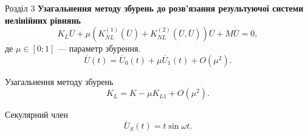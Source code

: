 \documentclass[handout, 8pt]{beamer}
\numberwithin{figure}{section}
\numberwithin{equation}{section}
\numberwithin{table}{section}
\begin{document}
\begin{frame}{Розділ 3}
\textbf{Узагальнення методу збурень до розв’язання результуючої системи нелінійних рівнянь}
\begin{equation}\label{eq:nonlineq}
K_L\overline{U}+\mu \left( K_{NL}^{(1)}\left( \overline{U}\right)+K_{NL}^{(2)}\left( \overline{U},\overline{U}\right) \right)\overline{U}+M\ddot{\overline{U}}=0,
\end{equation}
де $\mu \in [0;1]$ --- параметр збурення.
\begin{equation}
\overline{U}\left(t\right) =\overline{U}_0\left(t\right) + \mu \overline{U}_1\left(t\right) + O\left( \mu^2\right).
\end{equation}

Узагальнення методу збурень
\begin{equation}
K_L = K - \mu K_{L1} + O\left( \mu^2\right).
\end{equation}

Секулярний член
\begin{equation}
\overline{U}_S\left(t\right) = t \sin \omega t.
\end{equation}

\end{frame}
\end{document}
